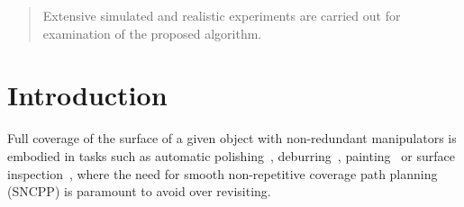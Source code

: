 \documentclass[Afour,sageh,times]{sagej}
\begin{document}
\begin{abstract}

Extensive simulated and realistic experiments are carried out for examination of the proposed algorithm. 
\end{abstract}


\maketitle

\section{Introduction}
Full coverage of the surface of a given object with non-redundant manipulators is embodied in tasks such as automatic polishing~\cite{Tian2016Polishing}, deburring~\cite{Xie2016Grinding}, painting~\cite{Li2011Painting} or surface inspection~\cite{Molina2017Defects}, where the need for smooth non-repetitive coverage path planning (SNCPP) is paramount to avoid over revisiting. 
\end{document}
